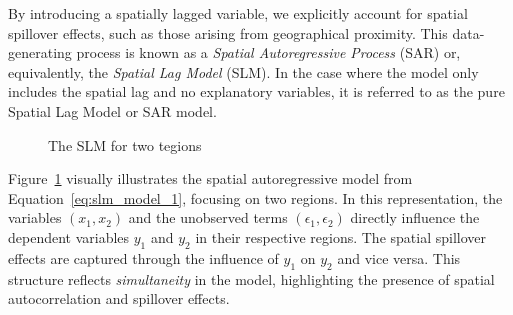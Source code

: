 \documentclass[english,12pt]{book}\usepackage[]{graphicx}\usepackage[]{xcolor}
\begin{document}
By introducing a spatially lagged variable, we explicitly account for spatial spillover effects, such as those arising from geographical proximity. This data-generating process is known as a \emph{Spatial Autoregressive Process} (SAR) or, equivalently, the \emph{Spatial Lag Model} (SLM). In the case where the model only includes the spatial lag and no explanatory variables, it is referred to as the pure Spatial Lag Model or SAR model.

\begin{figure}[ht]
	\caption{The SLM for two tegions}\label{figure:slm}
		\centering
\end{figure}

Figure~\ref{figure:slm} visually illustrates the spatial autoregressive model from Equation~\eqref{eq:slm_model_1}, focusing on two regions. In this representation, the variables $(x_1, x_2)$ and the unobserved terms $(\epsilon_1, \epsilon_2)$ directly influence the dependent variables $y_1$ and $y_2$ in their respective regions. The spatial spillover effects are captured through the influence of $y_1$ on $y_2$ and vice versa. This structure reflects \emph{simultaneity} in the model, highlighting the presence of spatial autocorrelation and spillover effects.
\end{document}
